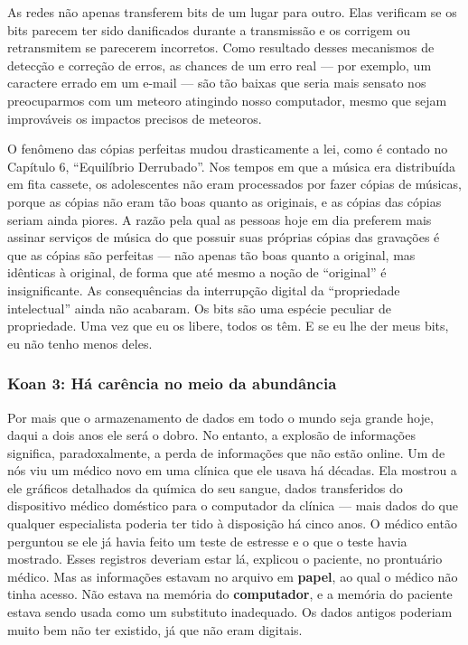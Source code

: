 As redes não apenas transferem bits de um lugar para outro. Elas verificam se os 
bits parecem ter sido danificados durante a transmissão e os corrigem ou 
retransmitem se parecerem incorretos. Como resultado desses mecanismos de 
detecção e correção de erros, as chances de um erro real --- por exemplo, um 
caractere errado em um e-mail --- são tão baixas que seria mais sensato nos 
preocuparmos com um meteoro atingindo nosso computador, mesmo que sejam 
improváveis os impactos precisos de meteoros.

O fenômeno das cópias perfeitas mudou drasticamente a lei, como é contado no
Capítulo 6, ``Equilíbrio Derrubado''. Nos tempos em que a música era distribuída
em fita cassete, os adolescentes não eram processados por fazer cópias de 
músicas, porque as cópias não eram tão boas quanto as originais, e as cópias das 
cópias seriam ainda piores. A razão pela qual as pessoas hoje em dia preferem 
mais assinar serviços de música do que possuir suas próprias cópias das 
gravações é que as cópias são perfeitas --- não apenas tão boas quanto a 
original, mas idênticas à original, de forma que até mesmo a noção de
``original'' é insignificante. As consequências da interrupção digital da
``propriedade intelectual'' ainda não acabaram. Os bits são uma espécie peculiar 
de propriedade. Uma vez que eu os libere, todos os têm. E se eu lhe der meus 
bits, eu não tenho menos deles.


\subsubsection*{Koan 3: Há carência no meio da abundância}
Por mais que o armazenamento de dados em todo o mundo seja grande hoje, daqui a
dois anos ele será o dobro. No entanto, a explosão de informações significa, 
paradoxalmente, a perda de informações que não estão online. Um de nós viu um 
médico novo em uma clínica que ele usava há décadas. Ela mostrou a ele gráficos 
detalhados da química do seu sangue, dados transferidos do dispositivo médico 
doméstico para o computador da clínica --- mais dados do que qualquer 
especialista poderia ter tido à disposição há cinco anos. O médico então 
perguntou se ele já havia feito um teste de estresse e o que o teste havia 
mostrado. Esses registros deveriam estar lá, explicou o paciente, no prontuário 
médico. Mas as informações estavam no arquivo em \textbf{papel}, ao qual o 
médico não tinha acesso. Não estava na memória do \textbf{computador}, e a
memória do paciente estava sendo usada como um substituto inadequado. Os dados
antigos poderiam muito bem não ter existido, já que não eram digitais.

